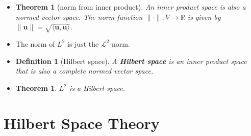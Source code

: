 \documentclass[10pt]{article}
\newtheorem{theorem}[lemma]{Theorem}
\newtheorem{definition}[lemma]{Definition}
\numberwithin{lemma}{section}
\newcommand{\ve}[1]{\mathbf{#1}}
\newcommand{\mcal}[1]{\mathcal{#1}}
\newcommand{\Real}{\mathbb{R}}
\begin{document}
\begin{itemize}
  \item \begin{theorem}[norm from inner product]
    An inner product space is also a normed vector space. The norm function $\| \cdot \|: V \rightarrow \Real$ is given by $\| \ve{u} \| = \sqrt{\langle \ve{u}, \ve{u} \rangle}$.
  \end{theorem}

  \item The norm of $L^2$ is just the $\mcal{L}^2$-norm.

  \item \begin{definition}[Hilbert space]
    A {\bf Hilbert space} is an inner product space that is also a complete normed vector space.
  \end{definition}

  \item \begin{theorem}
    $L^2$ is a Hilbert space.
  \end{theorem}
\end{itemize}

\section{Hilbert Space Theory}
\end{document}
